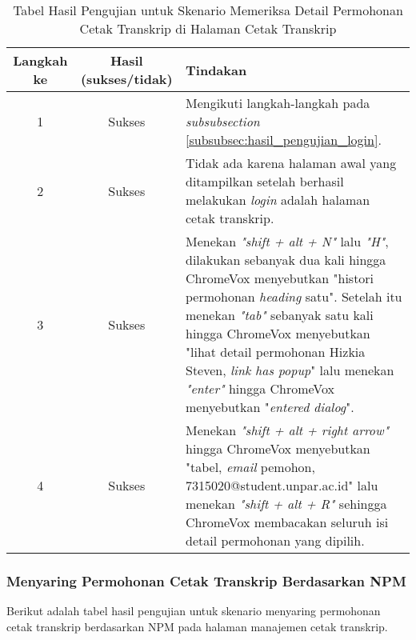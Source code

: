 \begin{table}[H]
    \centering 
    \caption{Tabel Hasil Pengujian untuk Skenario Memeriksa Detail Permohonan Cetak Transkrip di Halaman Cetak Transkrip}
    \label{tab:hasil_pengujian_memeriksa_detail_permohonan_cetak_transkrip_di_halaman_cetak_transkrip}
    \begin{tabular}{|c|c|p{10cm}|}
        \toprule
        Langkah ke & Hasil (sukses/tidak) & Tindakan \\

        \midrule
        1 & Sukses & Mengikuti langkah-langkah pada \textit{subsubsection} \ref{subsubsec:hasil_pengujian_login}. \\
        2 & Sukses & Tidak ada karena halaman awal yang ditampilkan setelah berhasil melakukan \textit{login} adalah halaman cetak transkrip. \\
        3 & Sukses & Menekan \textit{"shift + alt + N"} lalu \textit{"H"}, dilakukan sebanyak dua kali hingga ChromeVox menyebutkan "histori permohonan \textit{heading} satu". Setelah itu menekan \textit{"tab"} sebanyak satu kali hingga ChromeVox menyebutkan "lihat detail permohonan Hizkia Steven, \textit{link has popup}" lalu menekan \textit{"enter"} hingga ChromeVox menyebutkan "\textit{entered dialog}". \\
        4 & Sukses & Menekan \textit{"shift + alt + right arrow"} hingga ChromeVox menyebutkan "tabel, \textit{email} pemohon, 7315020@student.unpar.ac.id" lalu menekan \textit{"shift + alt + R"} sehingga ChromeVox membacakan seluruh isi detail permohonan yang dipilih. \\

        \bottomrule

    \end{tabular}
\end{table}

\subsubsection{Menyaring Permohonan Cetak Transkrip Berdasarkan NPM}
\label{subsubsec:hasil_pengujian_menyaring_permohonan_cetak_transkrip_berdasarkan_npm}
Berikut adalah tabel hasil pengujian untuk skenario menyaring permohonan cetak transkrip berdasarkan NPM pada halaman manajemen cetak transkrip.

